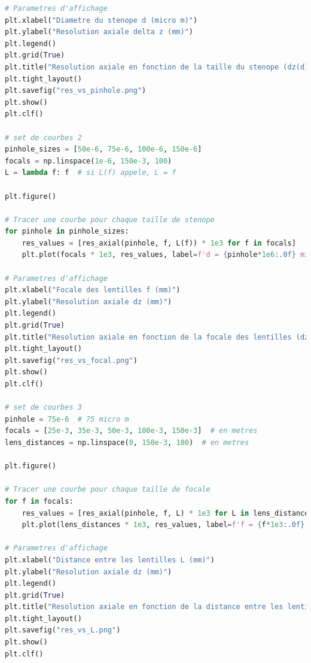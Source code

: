 \documentclass[11pt,letterpaper]{article}
\begin{document}
\begin{lstlisting}[language=python]
# Parametres d'affichage
plt.xlabel("Diametre du stenope d (micro m)")
plt.ylabel("Resolution axiale delta z (mm)")
plt.legend()
plt.grid(True)
plt.title("Resolution axiale en fonction de la taille du stenope (dz(d))")
plt.tight_layout()
plt.savefig("res_vs_pinhole.png")
plt.show()
plt.clf()

# set de courbes 2
pinhole_sizes = [50e-6, 75e-6, 100e-6, 150e-6]
focals = np.linspace(1e-6, 150e-3, 100)
L = lambda f: f  # si L(f) appele, L = f

plt.figure()

# Tracer une courbe pour chaque taille de stenope
for pinhole in pinhole_sizes:
    res_values = [res_axial(pinhole, f, L(f)) * 1e3 for f in focals]
    plt.plot(focals * 1e3, res_values, label=f'd = {pinhole*1e6:.0f} micro m')

# Parametres d'affichage
plt.xlabel("Focale des lentilles f (mm)")
plt.ylabel("Resolution axiale dz (mm)")
plt.legend()
plt.grid(True)
plt.title("Resolution axiale en fonction de la focale des lentilles (dz(f))")
plt.tight_layout()
plt.savefig("res_vs_focal.png")
plt.show()
plt.clf()

# set de courbes 3
pinhole = 75e-6  # 75 micro m
focals = [25e-3, 35e-3, 50e-3, 100e-3, 150e-3]  # en metres
lens_distances = np.linspace(0, 150e-3, 100)  # en metres

plt.figure()

# Tracer une courbe pour chaque taille de focale
for f in focals:
    res_values = [res_axial(pinhole, f, L) * 1e3 for L in lens_distances]
    plt.plot(lens_distances * 1e3, res_values, label=f'f = {f*1e3:.0f} mm')

# Parametres d'affichage
plt.xlabel("Distance entre les lentilles L (mm)")
plt.ylabel("Resolution axiale dz (mm)")
plt.legend()
plt.grid(True)
plt.title("Resolution axiale en fonction de la distance entre les lentilles (dz(L))")
plt.tight_layout()
plt.savefig("res_vs_L.png")
plt.show()
plt.clf()
\end{lstlisting}



\clearpage

% 
% 
\end{document}
